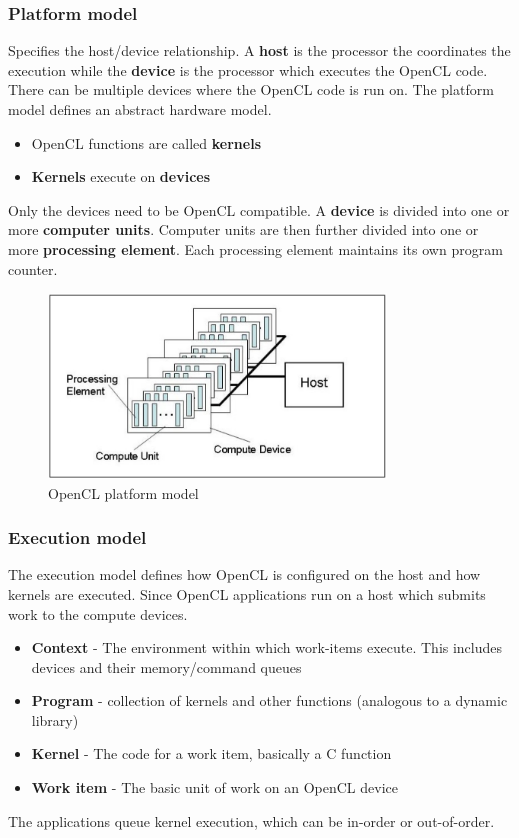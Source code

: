 \documentclass[11pt]{article}
\begin{document}
\subsubsection*{Platform model}
Specifies the host/device relationship. A \textbf{host} is the processor the coordinates the execution while the \textbf{device} is the processor which executes the OpenCL code. There can be multiple devices where the OpenCL code is run on. 
\n
The platform model defines an abstract hardware model.
\begin{itemize}
\item OpenCL functions are called \textbf{kernels}
\item \textbf{Kernels} execute on \textbf{devices}
\end{itemize}
Only the devices need to be OpenCL compatible. 
\n
A \textbf{device} is divided into one or more \textbf{computer units}. Computer units are then further divided into one or more \textbf{processing element}. Each processing element maintains its own program counter. 
\begin{figure}[H]
\centering
\includegraphics[width=0.8\textwidth, keepaspectratio]{imgs/opencl-platform-model.jpg}
\caption{OpenCL platform model}
\end{figure}

\subsubsection*{Execution model}
The execution model defines how OpenCL is configured on the host and how kernels are executed. Since OpenCL applications run on a host which submits work to the compute devices.
\begin{itemize}
\item \textbf{Context} - The environment within which work-items execute. This includes devices and their memory/command queues
\item \textbf{Program} - collection of kernels and other functions (analogous to a dynamic library)
\item \textbf{Kernel} - The code for a work item, basically a C function
\item \textbf{Work item} - The basic unit of work on an OpenCL device
\end{itemize}
The applications queue kernel execution, which can be in-order or out-of-order. 
\end{document}
